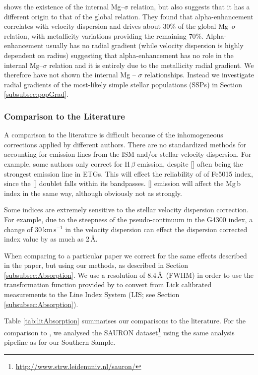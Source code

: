			\citet{Mehlert2003} shows the existence of the internal Mg--$\mathrm{\sigma}$ relation, but also suggests that it has a different origin to that of the global relation. They found that alpha-enhancement correlates with velocity dispersion and drives about 30\% of the global Mg--$\sigma$ relation, with metallicity variations providing the remaining 70\%. Alpha-enhancement usually has no radial gradient (while velocity dispersion is highly dependent on radius) suggesting that alpha-enhancement has no role in the internal Mg--$\sigma$ relation and it is entirely due to the metallicity radial gradient. We therefore have not shown the internal Mg -- $\sigma$ relationships. Instead we investigate radial gradients of the most-likely simple stellar populations (SSPs) in Section \ref{subsubsec:popGrad}.


		\subsubsection{Comparison to the Literature}
			\label{subsubsec:Lit}

			A comparison to the literature is difficult because of the inhomogeneous corrections applied by different authors. There are no standardized methods for accounting for emission lines from the ISM and/or stellar velocity dispersion. For example, some authors only correct for H\,$\beta$ emission, despite [] often being the strongest emission line in ETGs. This will effect the reliability of of Fe5015 index, since the [] doublet falls within its bandpasses. [] emission will affect the Mg\,b index in the same way, although obviously not as strongly.

			Some indices are extremely sensitive to the stellar velocity dispersion correction. For example, due to the steepness of the pseudo-continuum in the G4300 index, a change of $30 \, \mathrm{km\,s^{-1}}$ in the velocity dispersion can effect the dispersion corrected index value by as much as 2\,\AA.

			When comparing to a particular paper we correct for the same effects described in the paper, but using our methods, as described in Section \ref{subsubsec:Absorption}. We use a resolution of 8.4\,\AA\ (FWHM) in order to use the transformation function provided by \citet{Vazdekis2010} to convert from Lick calibrated measurements to the Line Index System (LIS; see Section \ref{subsubsec:Absorption}). 

			Table \ref{tab:litAbsorption} summarises our comparisons to the literature. For the comparison to \citet{Vazdekis2010}, we analysed the SAURON dataset\footnote{\url{http://www.strw.leidenuniv.nl/sauron/}} \citep{Emsellem2004} using the same analysis pipeline as for our Southern Sample. 


